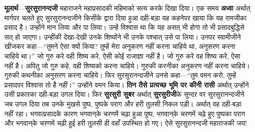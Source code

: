 \begin{sloppypar}\justifying{}
\textbf{मूलार्थ}—\textbf{सुरसुरानन्दजी} महाराजने महा\-प्रसादकी महिमाको सत्य करके दिखा दिया। एक समय \textbf{अध्वा} अर्थात् मार्गपर चलते हुए सुरसुरानन्दजीने किसीके द्वारा दिया हुआ दही-बड़ा यह कहनेपर खाया कि यह रामजीका प्रसाद है। उन्होंने मान लिया और पा लिया। उन्हें विश्वास था कि यह असत् भी होगा तो भी प्रसाद\-बुद्धिसे सत् हो जाएगा। उन्हींकी देखा-देखी उनके शिष्योंने भी उनके पश्चात् उसे पा लिया। उनपर स्वामीजीने खीजकर कहा—“तुमने ऐसा क्यों किया? तुम्हें मेरा अनुकरण नहीं करना चाहिये था, अनुसरण करना चाहिये था।” जो गुरु करे वही शिष्य करे, ऐसी कोई राजाज्ञा नहीं है। जो गुरु करे वह शिष्य करे, ऐसा नहीं है। अपितु जो गुरु कहे, वही शिष्यको करना चाहिये। गुरुकी करनीका अनुकरण नहीं करना चाहिये। गुरुकी कथनीका अनुसरण करना चाहिये। फिर सुरसुरानन्दजीने उनसे कहा—“तुम वमन करो, तुम्हें प्रसादपर विश्वास तो है नहीं।” उन्होंने वमन किया। \textbf{तिन तैसे प्रत्यच्छ भूमि पर कीनी रासी} अर्थात् उन्होंने उसी प्रकारका दही-बड़ा उगल दिया। फिर \textbf{सुरसुरी सुबर} अर्थात् \textbf{सुरसुरीजी}के सुन्दर वर सुरसुरानन्दजीने जब उगल दिया तब उनके मुखसे पुष्प, पुष्पके पराग और हरी तुलसी निकल पड़ी। अर्थात् वह दही-बड़ा नहीं रहा। भगवत्प्रसादके कारण भगवान्‌के चरणमें चढ़ा हुआ पुष्प, भगवान्‌के चरणमें चढ़े हुए पुष्पका पराग और भगवान्‌के चरणमें चढ़ी हुई हरी तुलसी ही वहाँ उपस्थित हो गए। ऐसे सुरसुरानन्दजी महाराजकी जय!
\end{sloppypar}


